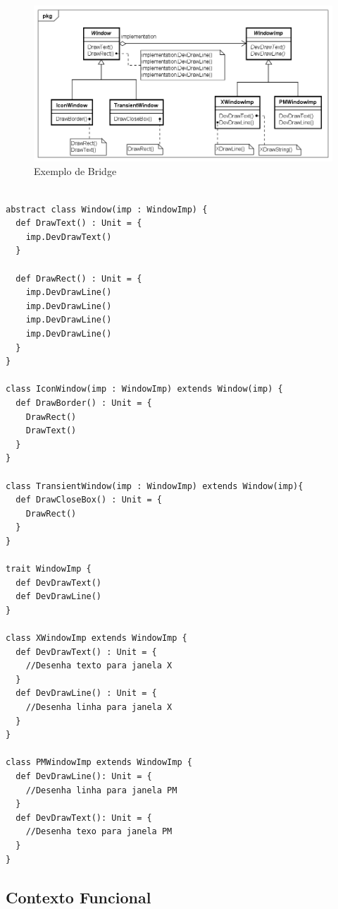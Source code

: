 \begin{figure}[htb]
	\caption{\label{bridge_exemplo}Exemplo de Bridge}
	\begin{center}
	    \includegraphics[scale=0.5]{5_padroes-contexto-funcional/5.2_estruturais/5.2.2_bridge/bridge_exemplo.png}
	\end{center}
\end{figure}

\begin{lstlisting}[caption={Bridge Orientado a Objetos},label=oobridge]

abstract class Window(imp : WindowImp) {
  def DrawText() : Unit = {
    imp.DevDrawText()
  }

  def DrawRect() : Unit = {
    imp.DevDrawLine()
    imp.DevDrawLine()
    imp.DevDrawLine()
    imp.DevDrawLine()
  }
}

class IconWindow(imp : WindowImp) extends Window(imp) {
  def DrawBorder() : Unit = {
    DrawRect()
    DrawText()
  }
}

class TransientWindow(imp : WindowImp) extends Window(imp){
  def DrawCloseBox() : Unit = {
    DrawRect()
  }
}

trait WindowImp {
  def DevDrawText()
  def DevDrawLine()
}

class XWindowImp extends WindowImp {
  def DevDrawText() : Unit = {
    //Desenha texto para janela X
  }
  def DevDrawLine() : Unit = {
    //Desenha linha para janela X
  }
}

class PMWindowImp extends WindowImp {
  def DevDrawLine(): Unit = {
    //Desenha linha para janela PM
  }
  def DevDrawText(): Unit = {
    //Desenha texo para janela PM
  }
}

\end{lstlisting}


\subsection*{Contexto Funcional}

\begin{lstlisting}[caption={Bridge Funcional},label=fpbridge]
    

    
\end{lstlisting}
